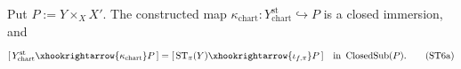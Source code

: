 \begin{proposition}
  \label{prop:nagata-strict-transform-closed-fiber-product}

  Put $P:=Y\times_XX'$.  The constructed map
  $\kappa_{\mathrm{chart}}\colon
    Y^{\mathrm{st}}_{\mathrm{chart}}\hookrightarrow P$
  is a closed immersion, and
  \[
    [\,Y^{\mathrm{st}}_{\mathrm{chart}}
      \xhookrightarrow{\kappa_{\mathrm{chart}}}P\,]
      =[\,\operatorname{ST}_\pi(Y)
      \xhookrightarrow{\iota_{f,\pi}}P\,]
      \quad\text{in }\operatorname{ClosedSub}(P).                \tag{ST6a}
  \]
\end{proposition}

